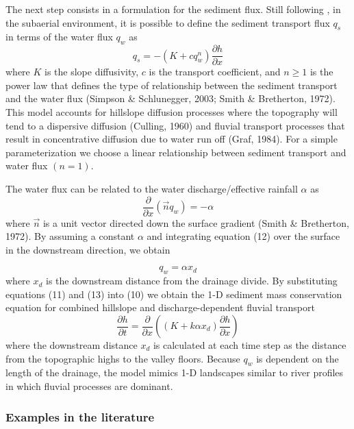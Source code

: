 The next step consists in a formulation for the sediment flux. Still following \cite{anpa19}, 
in the subaerial environment, it is possible to define the sediment transport 
flux $q_s$ in terms of the water flux $q_w$ as
\[
q_s=-(K+c q_w^n) \frac{\partial h}{\partial x}
\]
where $K$ is the slope diffusivity, $c$ is the transport coefficient, 
and $n \geq 1$ is the power law that defines the type
of relationship between the sediment transport and the water flux 
(Simpson \& Schlunegger, 2003; Smith \& Bretherton, 1972).
This model accounts for hillslope diffusion processes where the topography will tend to
a dispersive diffusion (Culling, 1960) and fluvial transport processes that result in concentrative diffusion
due to water run off (Graf, 1984). For a simple parameterization we choose a linear relationship between
sediment transport and water flux $(n=1)$.

The water flux can be related to the water discharge/effective rainfall $\alpha$ as
\[
\frac{\partial}{\partial x} (\vec{n} q_w) = -\alpha
\]
where $\vec n$ is a unit vector directed down the surface gradient (Smith \& Bretherton, 1972). 
By assuming a constant $\alpha$ and integrating equation (12) over the surface in the downstream direction, we obtain

\[
q_w = \alpha x_d
\]
where $x_d$ is the downstream distance from the drainage divide. By substituting equations (11) and
(13) into (10) we obtain the 1-D sediment mass conservation equation for combined hillslope and
discharge-dependent fluvial transport
\[
\frac{\partial h}{\partial t} = \frac{\partial}{\partial x} \left( (K+k \alpha x_d) 
\frac{\partial h}{\partial x}   \right)
\]
where the downstream distance $x_d$ is calculated at each time step as the distance from the topographic highs
to the valley floors. Because $q_w$ is dependent on the length of the drainage, the model mimics 1-D landscapes
similar to river profiles in which fluvial processes are dominant.

\subsubsection{Examples in the literature}

